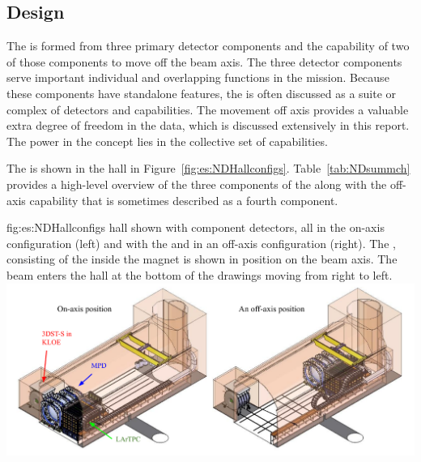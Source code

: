 \subsection{Design}
\label{sec:exsum-nd-BriefOverview-design}


The   is formed from three primary detector components and the capability of two of those components to move off the beam axis. The three detector components serve important individual and overlapping functions in the  mission.  Because these components have standalone features, the   is often discussed as a suite or complex of detectors and capabilities.  The movement off axis provides a valuable extra degree of freedom in the data, which is discussed extensively in this report.  The power in the   concept lies in the collective set of capabilities.  

The   is shown in the   hall in Figure~\ref{fig:es:NDHallconfigs}.  Table~\ref{tab:NDsummch} provides a high-level overview of the three components of the   along with the off-axis capability that is sometimes described as a fourth component.  

\begin{dunefigure}{fig:es:NDHallconfigs}
{  hall shown with component detectors, all in the on-axis configuration (left) and with the  and  in an off-axis configuration (right). The , consisting of the   inside the  magnet is shown in position on the beam axis. The beam enters the hall at the bottom of the drawings moving from right to left.}
\includegraphics[width=\textwidth]{graphics/hall_drawing_oct_19.pdf}
\end{dunefigure}



